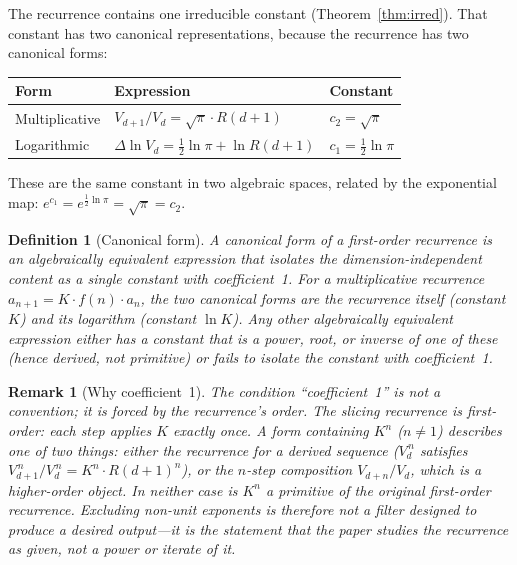 \documentclass[11pt,a4paper]{article}
\newtheorem{definition}[theorem]{Definition}
\newtheorem{remark}[theorem]{Remark}
\begin{document}
The recurrence contains one irreducible constant
(Theorem~\ref{thm:irred}). That constant has two canonical
representations, because the recurrence has two canonical forms:

\begin{center}
\begin{tabular}{lll}
\toprule
Form & Expression & Constant \\
\midrule
Multiplicative & $V_{d+1}/V_d = \sqrt{\pi}\cdot R(d+1)$ &
$c_2 = \sqrt{\pi}$ \\
Logarithmic & $\Delta\ln V_d = \frac{1}{2}\ln\pi + \ln R(d+1)$ &
$c_1 = \frac{1}{2}\ln\pi$ \\
\bottomrule
\end{tabular}
\end{center}

These are the same constant in two algebraic spaces, related by the
exponential map: $e^{c_1} = e^{\frac{1}{2}\ln\pi} = \sqrt{\pi} = c_2$.

\begin{definition}[Canonical form]\label{def:canonical}
A canonical form of a first-order recurrence is an algebraically equivalent
expression that isolates the dimension-independent content as a single
constant with coefficient~1. For a multiplicative recurrence
$a_{n+1} = K\cdot f(n)\cdot a_n$, the two canonical forms are the
recurrence itself (constant $K$) and its logarithm (constant $\ln K$).
Any other algebraically equivalent expression either has a constant that
is a power, root, or inverse of one of these (hence derived, not
primitive) or fails to isolate the constant with coefficient~1.
\end{definition}

\begin{remark}[Why coefficient~1]\label{rem:coeff1}
The condition ``coefficient~1'' is not a convention; it is forced by the
recurrence's order. The slicing recurrence is first-order: each step
applies $K$ exactly once. A form containing $K^n$ ($n\neq 1$) describes
one of two things: either the recurrence for a derived sequence
($V_d^{\,n}$ satisfies $V_{d+1}^{\,n}/V_d^{\,n} = K^n\cdot R(d+1)^n$), or
the $n$-step composition $V_{d+n}/V_d$, which is a higher-order object.
In neither case is $K^n$ a primitive of the original first-order
recurrence. Excluding non-unit exponents is therefore not a filter designed
to produce a desired output---it is the statement that the paper studies
the recurrence as given, not a power or iterate of it.
\end{remark}
\end{document}
